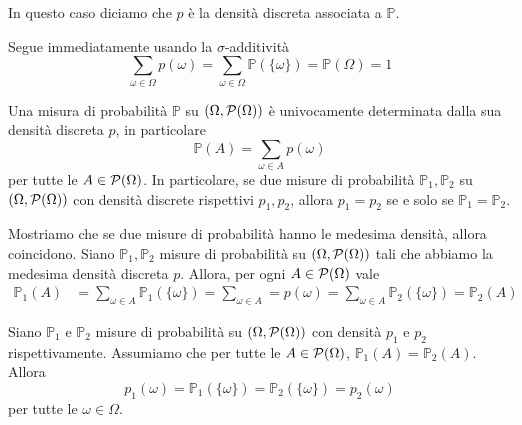 \documentclass[a4paper]{article}
\begin{document}
In questo caso diciamo che \(p\) è la densità discreta associata a \(\mathbb P\).

\begin{snippetproof}{}
    Segue immediatamente usando la \(\sigma\)-additività
    \[
        \sum_{\omega \in \Omega} p(\omega) = \sum_{\omega \in \Omega} \mathbb P(\{\omega\}) = \mathbb P(\Omega) = 1
    \]
\end{snippetproof}

\begin{snippetproposition}{}
    Una misura di probabilità \(\mathbb P\) su \((\Omega, \mathcal P(\Omega))\)
    è univocamente determinata dalla sua densità discreta
    \(p\), in particolare
    \[
        \mathbb P(A) = \sum_{\omega \in A} p(\omega)
    \]
    per tutte le \(A \in \mathcal P(\Omega)\).
    In particolare, se due misure di probabilità \(\mathbb P_1, \mathbb P_2\)
    su \((\Omega, \mathcal P(\Omega))\) con densità discrete rispettivi \(p_1, p_2\),
    allora \(p_1 = p_2\) se e solo se \(\mathbb P_1 = \mathbb P_2\).
\end{snippetproposition}

\begin{snippetproof}{}
    \begin{iffproof}
    \item Mostriamo che se due misure di probabilità hanno le medesima densità, allora coincidono.
        Siano \(\mathbb P_1, \mathbb P_2\) misure di probabilità
        su \((\Omega, \mathcal P(\Omega))\)
        tali che abbiamo la medesima densità discreta \(p\).
        Allora, per ogni \(A \in \mathcal P(\Omega)\) vale
        \begin{align*}
            \mathbb P_1(A) &= \sum_{\omega \in A} \mathbb P_1(\{\omega\})
            = \sum_{\omega \in A} = p(\omega)
            = \sum_{\omega \in A} \mathbb P_2(\{\omega\}) = \mathbb P_2(A)
        \end{align*}
    \item Siano \(\mathbb P_1\) e \(\mathbb P_2\)
        misure di probabilità su \((\Omega, \mathcal P(\Omega))\)
        con densità \(p_1\) e \(p_2\)
        rispettivamente. Assumiamo
        che per tutte le \(A \in \mathcal P(\Omega)\), \(\mathbb P_1(A) = \mathbb P_2(A)\).
        Allora
        \[
            p_1(\omega) = \mathbb P_1(\{\omega\})
            = \mathbb P_2(\{\omega\}) = p_2(\omega)
        \]
        per tutte le \(\omega \in \Omega\).
    \end{iffproof}
\end{snippetproof}
\end{document}
